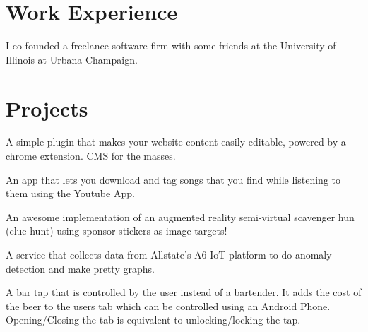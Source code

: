 \documentclass[]{deedy-resume-openfont}
\begin{document}
\begin{minipage}[t]{0.66\textwidth} 


\section{Work Experience} 
I co-founded a freelance software firm with some friends at the University of Illinois at Urbana-Champaign.

\sectionsep


\section{Projects}
A simple plugin that makes your website content easily editable, powered by a chrome extension. CMS for the masses.
\sectionsep

An app that lets you download and tag songs that you find while listening to them using the Youtube App.
\sectionsep

An awesome implementation of an augmented reality semi-virtual scavenger hun (clue hunt) using sponsor stickers as image targets!
\sectionsep

A service that collects data from Allstate's A6 IoT platform to do anomaly detection and make pretty graphs.
\sectionsep

A bar tap that is controlled by the user instead of a bartender. It adds the cost of the beer to the users tab which can be controlled using an Android Phone. Opening/Closing the tab is equivalent to unlocking/locking the tap.
\sectionsep


\end{minipage}
\end{document}
